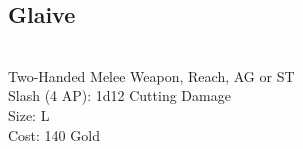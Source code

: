 \subsection{Glaive}\label{weapon:glaive}\\
Two-Handed Melee Weapon,  Reach, AG or ST\\
Slash (4 AP): 1d12 Cutting Damage\\
Size: L\\
Cost: 140 Gold\\
